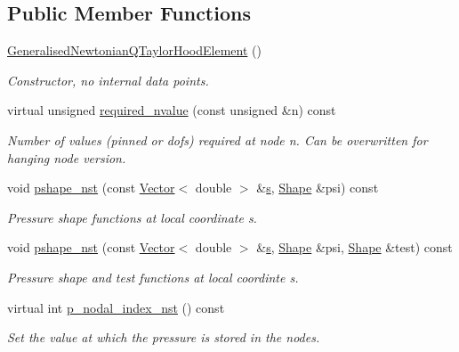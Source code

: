 \subsection*{Public Member Functions}
\begin{DoxyCompactItemize}
\item 
\hyperlink{classoomph_1_1GeneralisedNewtonianQTaylorHoodElement_a0810ec28d1c3c7b43c9759df364f5d48}{Generalised\+Newtonian\+Q\+Taylor\+Hood\+Element} ()
\begin{DoxyCompactList}\small\item\em Constructor, no internal data points. \end{DoxyCompactList}\item 
virtual unsigned \hyperlink{classoomph_1_1GeneralisedNewtonianQTaylorHoodElement_a8da856de8ba84f81516e487b65cc7d9c}{required\+\_\+nvalue} (const unsigned \&n) const
\begin{DoxyCompactList}\small\item\em Number of values (pinned or dofs) required at node n. Can be overwritten for hanging node version. \end{DoxyCompactList}\item 
void \hyperlink{classoomph_1_1GeneralisedNewtonianQTaylorHoodElement_a7ec2ae0068b4c02cca984dfb549b083e}{pshape\+\_\+nst} (const \hyperlink{classoomph_1_1Vector}{Vector}$<$ double $>$ \&\hyperlink{cfortran_8h_ab7123126e4885ef647dd9c6e3807a21c}{s}, \hyperlink{classoomph_1_1Shape}{Shape} \&psi) const
\begin{DoxyCompactList}\small\item\em Pressure shape functions at local coordinate s. \end{DoxyCompactList}\item 
void \hyperlink{classoomph_1_1GeneralisedNewtonianQTaylorHoodElement_a8eaa00a86146a184fc2fae213061f200}{pshape\+\_\+nst} (const \hyperlink{classoomph_1_1Vector}{Vector}$<$ double $>$ \&\hyperlink{cfortran_8h_ab7123126e4885ef647dd9c6e3807a21c}{s}, \hyperlink{classoomph_1_1Shape}{Shape} \&psi, \hyperlink{classoomph_1_1Shape}{Shape} \&test) const
\begin{DoxyCompactList}\small\item\em Pressure shape and test functions at local coordinte s. \end{DoxyCompactList}\item 
virtual int \hyperlink{classoomph_1_1GeneralisedNewtonianQTaylorHoodElement_a1100787d48487bdb1ca3201b49c9c41f}{p\+\_\+nodal\+\_\+index\+\_\+nst} () const
\begin{DoxyCompactList}\small\item\em Set the value at which the pressure is stored in the nodes. \end{DoxyCompactList}\item 

\end{DoxyCompactItemize}
